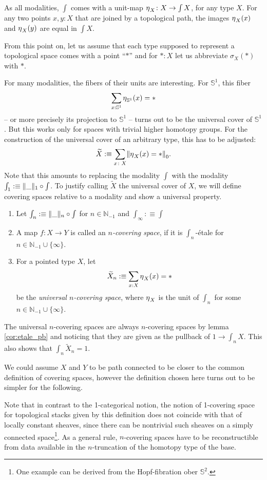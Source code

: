 \documentclass[9pt,twosided]{amsart}
\newcommand{\shape}{\int}
\newcommand{\bN}{\mathbb N}
\newcommand{\bS}{\mathbb S}
\begin{document}
As all modalities, $\shape$ comes with a unit-map $\modalunit_X\colon X \to \shape X$, for any type $X$.
For any two points $x,y: X$ that are joined by a topological path, 
the images ${\eta_{}}_X(x)$ and ${\eta_{}}_X(y)$ are equal in $\shape X$.

From this point on, 
let us assume that each type supposed to represent a topological space comes with a point ``$\ast$''
and for $\ast:X$ let us abbreviate $\sigma_X(\ast)$ with $\ast$.
  
For many modalities, the fibers of their units are interesting.
For $\bS^{1}$, this fiber
\[ \sum_{x:\bS^{1}}\modalunit_{\bS^{1}}(x)=\ast \]
-- or more precisely its projection to $\bS^{1}$ -- turns out to be the universal cover of $\bS^{1}$.
But this works only for spaces with trivial higher homotopy groups. 
For the construction of the universal cover of an arbitrary type, this has to be adjusted:
\[ \widetilde{X}:\equiv \sum_{x\colon X} \trunc{0}{\modalunit_X(x)=\ast}. \]
Note that this amounts to replacing the modality $\shape$ with the modality $\shape_1:\equiv\trunc{1}{\_}\circ\shape$.
To justify calling $\widetilde{X}$ the universal cover of $X$, 
we will define covering spaces relative to a modality and show a universal property.

\begin{defn}
  \begin{enumerate}
  \item Let $\shape_n:\equiv\trunc{n}{\_}\circ\shape$ for $n\in\bN_{-1}$ and $\shape_\infty:\equiv\shape$
  \item A map $f:X\to Y$ is called an \emph{$n$-covering space}, if it is $\shape_n$-étale for $n\in\bN_{-1}\cup\{\infty\}$.
  \item For a pointed type $X$, let
    \[ \widetilde{X}_n:\equiv\sum_{x:X}{\eta_{}}_X(x)=\ast \]
    be the \emph{universal $n$-covering space}, where ${\eta_{}}_X$ is the unit of $\shape_n$ for some $n\in\bN_{-1}\cup\{\infty\}$.
  \end{enumerate}
\end{defn}
The universal $n$-covering spaces are always $n$-covering spaces by lemma \ref{cor:etale_pb} and noticing that they are given as the pullback of $1\to\shape_nX$.
This also shows that $\shape_n \widetilde{X}_n = 1$.

We could assume $X$ and $Y$ to be path connected to be closer to the common definition of covering spaces,
however the definition chosen here turns out to be simpler for the following.

Note that in contrast to the 1-categorical notion, the notion of 1-covering space for topological stacks given by this definition does not coincide with that of locally constant sheaves, since there can be nontrivial such sheaves on a simply connected space\footnote{One example can be derived from the Hopf-fibration ober $\bS^2$.}.
As a general rule, $n$-covering spaces have to be reconstructible from data available in the $n$-truncation of the homotopy type of the base. 
\end{document}
